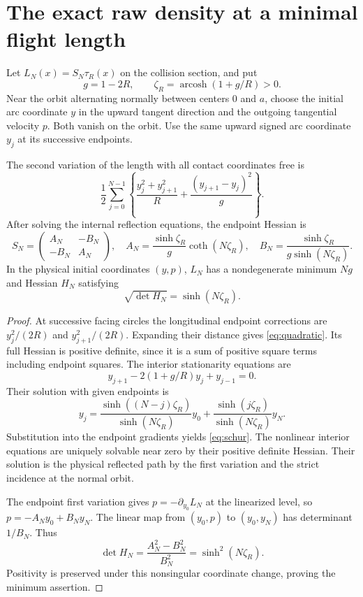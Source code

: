 \section{The exact raw density at a minimal flight length}
Let $L_N(x)=S_N\tau_R(x)$ on the collision section, and put
\[
 g=1-2R,\qquad \zeta_R=\operatorname{arcosh}(1+g/R)>0.
\]
Near the orbit alternating normally between centers $0$ and $a$, choose the initial arc coordinate $y$ in the upward tangent direction and the outgoing tangential velocity $p$. Both vanish on the orbit. Use the same upward signed arc coordinate $y_j$ at its successive endpoints.

\begin{lemma}\label{lem:hessian}
The second variation of the length with all contact coordinates free is
\begin{equation}\label{eq:quadratic}
 \frac12\sum_{j=0}^{N-1}
 \left\{\frac{y_j^2+y_{j+1}^2}{R}
             +\frac{(y_{j+1}-y_j)^2}{g}\right\}.
\end{equation}
After solving the internal reflection equations, the endpoint Hessian is
\begin{equation}\label{eq:schur}
 S_N=\begin{pmatrix}A_N&-B_N\\-B_N&A_N\end{pmatrix},\quad
 A_N=\frac{\sinh\zeta_R}{g}\coth(N\zeta_R),\quad
 B_N=\frac{\sinh\zeta_R}{g\sinh(N\zeta_R)}.
\end{equation}
In the physical initial coordinates $(y,p)$, $L_N$ has a nondegenerate minimum $Ng$ and Hessian $H_N$ satisfying
\begin{equation}\label{eq:detH}
             \sqrt{\det H_N}=\sinh(N\zeta_R).
\end{equation}
\end{lemma}
\begin{proof}
At successive facing circles the longitudinal endpoint corrections are $y_j^2/(2R)$ and $y_{j+1}^2/(2R)$. Expanding their distance gives \eqref{eq:quadratic}. Its full Hessian is positive definite, since it is a sum of positive square terms including endpoint squares. The interior stationarity equations are
\[
 y_{j+1}-2(1+g/R)y_j+y_{j-1}=0.
\]
Their solution with given endpoints is
\[
 y_j=\frac{\sinh((N-j)\zeta_R)}{\sinh(N\zeta_R)}y_0
       +\frac{\sinh(j\zeta_R)}{\sinh(N\zeta_R)}y_N.
\]
Substitution into the endpoint gradients yields \eqref{eq:schur}. The nonlinear interior equations are uniquely solvable near zero by their positive definite Hessian. Their solution is the physical reflected path by the first variation and the strict incidence at the normal orbit.

The endpoint first variation gives $p=-\partial_{y_0}L_N$ at the linearized level, so $p=-A_Ny_0+B_Ny_N$. The linear map from $(y_0,p)$ to $(y_0,y_N)$ has determinant $1/B_N$. Thus
\[
 \det H_N=\frac{A_N^2-B_N^2}{B_N^2}
                         =\sinh^2(N\zeta_R).
\]
Positivity is preserved under this nonsingular coordinate change, proving the minimum assertion.
\end{proof}

